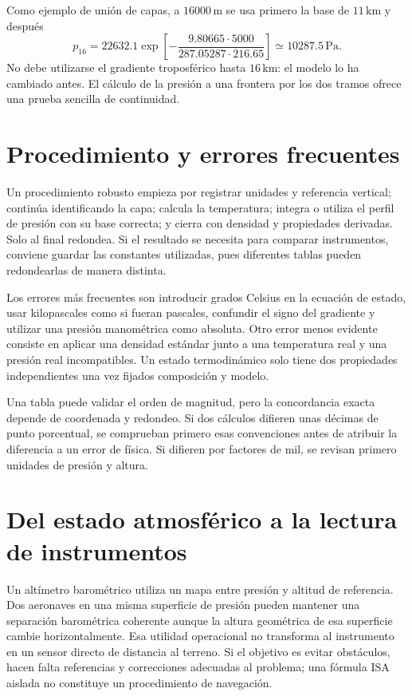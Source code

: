 Como ejemplo de unión de capas, a $16000\,\mathrm{m}$ se usa primero la base de $11\,\mathrm{km}$ y después
\begin{equation}
 p_{16}=22632.1\exp\left[-\frac{9.80665\cdot5000}{287.05287\cdot216.65}\right]
 \simeq10287.5\,\mathrm{Pa}.
\end{equation}
No debe utilizarse el gradiente troposférico hasta $16\,\mathrm{km}$: el modelo lo ha cambiado antes. El cálculo de la presión a una frontera por los dos tramos ofrece una prueba sencilla de continuidad.

\section{Procedimiento y errores frecuentes}
Un procedimiento robusto empieza por registrar unidades y referencia vertical; continúa identificando la capa; calcula la temperatura; integra o utiliza el perfil de presión con su base correcta; y cierra con densidad y propiedades derivadas. Solo al final redondea. Si el resultado se necesita para comparar instrumentos, conviene guardar las constantes utilizadas, pues diferentes tablas pueden redondearlas de manera distinta.

Los errores más frecuentes son introducir grados Celsius en la ecuación de estado, usar kilopascales como si fueran pascales, confundir el signo del gradiente y utilizar una presión manométrica como absoluta. Otro error menos evidente consiste en aplicar una densidad estándar junto a una temperatura real y una presión real incompatibles. Un estado termodinámico solo tiene dos propiedades independientes una vez fijados composición y modelo.

Una tabla puede validar el orden de magnitud, pero la concordancia exacta depende de coordenada y redondeo. Si dos cálculos difieren unas décimas de punto porcentual, se comprueban primero esas convenciones antes de atribuir la diferencia a un error de física. Si difieren por factores de mil, se revisan primero unidades de presión y altura.

\section{Del estado atmosférico a la lectura de instrumentos}
Un altímetro barométrico utiliza un mapa entre presión y altitud de referencia. Dos aeronaves en una misma superficie de presión pueden mantener una separación barométrica coherente aunque la altura geométrica de esa superficie cambie horizontalmente. Esa utilidad operacional no transforma al instrumento en un sensor directo de distancia al terreno. Si el objetivo es evitar obstáculos, hacen falta referencias y correcciones adecuadas al problema; una fórmula ISA aislada no constituye un procedimiento de navegación.

